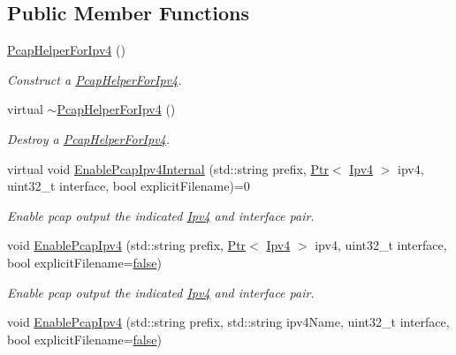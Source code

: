 \subsection*{Public Member Functions}
\begin{DoxyCompactItemize}
\item 
\hyperlink{classns3_1_1PcapHelperForIpv4_aa6f584645c259bfcb8624209c0c7d031}{Pcap\+Helper\+For\+Ipv4} ()
\begin{DoxyCompactList}\small\item\em Construct a \hyperlink{classns3_1_1PcapHelperForIpv4}{Pcap\+Helper\+For\+Ipv4}. \end{DoxyCompactList}\item 
virtual \hyperlink{classns3_1_1PcapHelperForIpv4_a5ddf54a4c791c80a9ab58965dcc162a7}{$\sim$\+Pcap\+Helper\+For\+Ipv4} ()
\begin{DoxyCompactList}\small\item\em Destroy a \hyperlink{classns3_1_1PcapHelperForIpv4}{Pcap\+Helper\+For\+Ipv4}. \end{DoxyCompactList}\item 
virtual void \hyperlink{classns3_1_1PcapHelperForIpv4_a53c5d7ab4e9cd1f079d1ea3be49787ea}{Enable\+Pcap\+Ipv4\+Internal} (std\+::string prefix, \hyperlink{classns3_1_1Ptr}{Ptr}$<$ \hyperlink{classns3_1_1Ipv4}{Ipv4} $>$ ipv4, uint32\+\_\+t interface, bool explicit\+Filename)=0
\begin{DoxyCompactList}\small\item\em Enable pcap output the indicated \hyperlink{classns3_1_1Ipv4}{Ipv4} and interface pair. \end{DoxyCompactList}\item 
void \hyperlink{classns3_1_1PcapHelperForIpv4_a90f0bbea2e43dd6b3106232809c6de41}{Enable\+Pcap\+Ipv4} (std\+::string prefix, \hyperlink{classns3_1_1Ptr}{Ptr}$<$ \hyperlink{classns3_1_1Ipv4}{Ipv4} $>$ ipv4, uint32\+\_\+t interface, bool explicit\+Filename=\hyperlink{lte__cqi__generation_8m_ab1bef239d413c4da139c4bac92cd657a}{false})
\begin{DoxyCompactList}\small\item\em Enable pcap output the indicated \hyperlink{classns3_1_1Ipv4}{Ipv4} and interface pair. \end{DoxyCompactList}\item 
void \hyperlink{classns3_1_1PcapHelperForIpv4_afe435ed89cc9bd7bb7b02dab63087c35}{Enable\+Pcap\+Ipv4} (std\+::string prefix, std\+::string ipv4\+Name, uint32\+\_\+t interface, bool explicit\+Filename=\hyperlink{lte__cqi__generation_8m_ab1bef239d413c4da139c4bac92cd657a}{false})

\end{DoxyCompactItemize}
